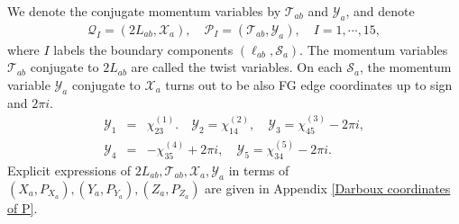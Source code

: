 \documentclass[aps,prd,notitlepage,nofootinbib,superscriptaddress,groupedaddress,twocolumn]{revtex4-1}
\def\be{\begin{eqnarray}}
\def\ee{\end{eqnarray}}
\newcommand{\cs}{\mathcal S}
\newcommand{\ct}{\mathcal T}
\newcommand{\cx}{\mathcal X}
\newcommand{\cy}{\mathcal Y}
\begin{document}


We denote the conjugate momentum variables by $\ct_{ab}$ and $\cy_a$, and denote
\be
\mathscr{Q}_I=(2L_{ab},\cx_a),\quad \mathscr{P}_I=(\ct_{ab},\cy_a),\quad I=1,\cdots,15,\nonumber
\ee
where $I$ labels the boundary components $(\ell_{ab},\cs_a)$. The momentum variables $\ct_{ab}$ conjugate to $2L_{ab}$ are called the twist variables. On each $\cs_a$, the momentum variable $\cy_a$ conjugate to $\cx_a$ turns out to be also FG edge coordinates up to sign and $2\pi i$.
\be
\cy_1&=&\chi^{(1)}_{23}. \quad
\cy_2=\chi^{(2)}_{14},\quad
\cy_3=\chi^{(3)}_{45}-2\pi i,\nonumber\\
\cy_4&=&-\chi^{(4)}_{35}+2\pi i,\quad
\cy_5=\chi^{(5)}_{34}-2\pi i.
\ee
Explicit expressions of $2L_{ab},\ct_{ab},\cx_{a},\cy_a$ in terms of $(X_a,P_{X_a}),(Y_a,P_{Y_a}),(Z_a,P_{Z_a})$ are given in Appendix \ref{Darboux coordinates of P}.
\end{document}
